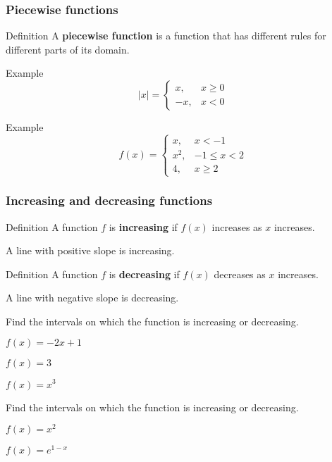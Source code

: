 \documentclass[t]{beamer}
\newenvironment{fpi}
  {\itemize[nolistsep,itemsep=\fill]}
  {\vfill\enditemize}
\begin{document}
\begin{frame}
\frametitle{Piecewise functions}
\begin{block}{Definition}
A \textbf{piecewise function} is a function that has different rules for different parts of its domain.
\end{block}
\begin{block}{Example}
$$
|x| = \begin{cases}
x, & x \ge 0 \\
-x, &  x < 0
\end{cases}
$$
\end{block}
\begin{block}{Example}
$$
f(x) = \begin{cases}
x, & x < -1 \\
x^2, &  -1 \le x < 2 \\
4, & x \ge 2
\end{cases}
$$
\end{block}

\end{frame}


\begin{frame}
\frametitle{Increasing and decreasing functions}
\begin{block}{Definition}
A function $f$ is \textbf{increasing} if $f(x)$ increases as $x$ increases.
\end{block}
A line with positive slope is increasing.
\begin{block}{Definition}
A function $f$ is \textbf{decreasing} if $f(x)$ decreases as $x$ increases.
\end{block}
A line with negative slope is decreasing.
\end{frame}

\begin{frame}{Find the intervals on which the function is increasing or decreasing.}
\begin{fpi}
\item $\displaystyle f(x) = -2x + 1$
\item $\displaystyle f(x) = 3$
\item $\displaystyle f(x) = x^3$
\end{fpi}
\end{frame}

\begin{frame}{Find the intervals on which the function is increasing or decreasing.}
\begin{fpi}
\item $\displaystyle f(x) = x^2$
\item $\displaystyle f(x) = e^{1-x}$
\end{fpi}
\end{frame}
\end{document}
